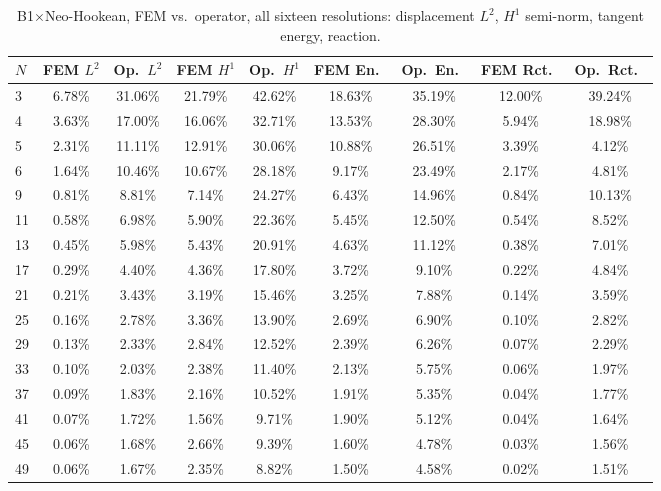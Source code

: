 \documentclass[11pt]{article}
\begin{document}
\begin{table}[h]
\centering
\caption{B1$\times$Neo-Hookean, FEM vs.\ operator, all sixteen resolutions:
  displacement $L^2$, $H^1$ semi-norm, tangent energy, reaction.}
\label{tab:s2-b1nh-a}
\scriptsize
\begin{tabular}{lcccccccc}
\toprule
$N$ & FEM $L^2$ & Op.\ $L^2$ & FEM $H^1$ & Op.\ $H^1$ & FEM En.\ & Op.\ En.\ & FEM Rct.\ & Op.\ Rct.\ \\
\midrule
3  & 6.78\%  & 31.06\% & 21.79\% & 42.62\% & 18.63\% & 35.19\% & 12.00\% & 39.24\% \\
4  & 3.63\%  & 17.00\% & 16.06\% & 32.71\% & 13.53\% & 28.30\% & 5.94\%  & 18.98\% \\
5  & 2.31\%  & 11.11\% & 12.91\% & 30.06\% & 10.88\% & 26.51\% & 3.39\%  & 4.12\%  \\
6  & 1.64\%  & 10.46\% & 10.67\% & 28.18\% & 9.17\%  & 23.49\% & 2.17\%  & 4.81\%  \\
9  & 0.81\%  & 8.81\%  & 7.14\%  & 24.27\% & 6.43\%  & 14.96\% & 0.84\%  & 10.13\% \\
11 & 0.58\%  & 6.98\%  & 5.90\%  & 22.36\% & 5.45\%  & 12.50\% & 0.54\%  & 8.52\%  \\
13 & 0.45\%  & 5.98\%  & 5.43\%  & 20.91\% & 4.63\%  & 11.12\% & 0.38\%  & 7.01\%  \\
17 & 0.29\%  & 4.40\%  & 4.36\%  & 17.80\% & 3.72\%  & 9.10\%  & 0.22\%  & 4.84\%  \\
21 & 0.21\%  & 3.43\%  & 3.19\%  & 15.46\% & 3.25\%  & 7.88\%  & 0.14\%  & 3.59\%  \\
25 & 0.16\%  & 2.78\%  & 3.36\%  & 13.90\% & 2.69\%  & 6.90\%  & 0.10\%  & 2.82\%  \\
29 & 0.13\%  & 2.33\%  & 2.84\%  & 12.52\% & 2.39\%  & 6.26\%  & 0.07\%  & 2.29\%  \\
33 & 0.10\%  & 2.03\%  & 2.38\%  & 11.40\% & 2.13\%  & 5.75\%  & 0.06\%  & 1.97\%  \\
37 & 0.09\%  & 1.83\%  & 2.16\%  & 10.52\% & 1.91\%  & 5.35\%  & 0.04\%  & 1.77\%  \\
41 & 0.07\%  & 1.72\%  & 1.56\%  & 9.71\%  & 1.90\%  & 5.12\%  & 0.04\%  & 1.64\%  \\
45 & 0.06\%  & 1.68\%  & 2.66\%  & 9.39\%  & 1.60\%  & 4.78\%  & 0.03\%  & 1.56\%  \\
49 & 0.06\%  & 1.67\%  & 2.35\%  & 8.82\%  & 1.50\%  & 4.58\%  & 0.02\%  & 1.51\%  \\
\bottomrule
\end{tabular}
\end{table}
\end{document}

